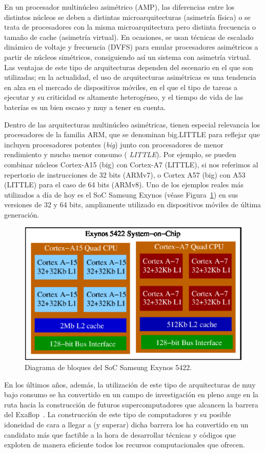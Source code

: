 En un procesador multinúcleo asimétrico (AMP), las diferencias entre los
distintos núcleos se deben a distintas microarquitecturas (asimetría
física) o se trata de procesadores con la misma microarquitectura pero
distinta frecuencia o tamaño de cache (asimetría virtual). En ocasiones, se
usan técnicas de escalado dinámico de voltaje y frecuencia (DVFS) para
emular procesadores asimétricos a partir de núcleos simétricos,
consiguiendo así un sistema con asimetría virtual. Las ventajas de este
tipo de arquitecturas dependen del escenario en el que son utilizadas; en
la actualidad, el uso de arquitecturas asimétricas es una tendencia en alza
en el mercado de dispositivos móviles, en el que el tipo de tareas a
ejecutar y su criticidad es altamente heterogéneo, y el tiempo de vida de
las baterías es un bien escaso y muy a tener en cuenta.

Dentro de las arquitecturas multinúcleo asimétricas, tienen especial
relevancia los procesadores de la familia ARM, que se denominan big.LITTLE
para reflejar que incluyen procesadores potentes ({\em big}) junto con
procesadores de menor rendimiento y mucho menor consumo ({\em
  LITTLE}). Por ejemplo, se pueden combinar núcleos Cortex-A15 (big)
con Cortex-A7 (LITTLE), si nos referimos al repertorio de instrucciones de
32 bits (ARMv7), o Cortex A57 (big) con A53 (LITTLE) para el caso de 64
bits (ARMv8). Uno de los ejemplos reales más utilizados a día de hoy es el
SoC Samsung Exynos (véase Figura~\ref{fig:exynos}) en sus versiones de 32 y
64 bits, ampliamente utilizado en dispositivos móviles de última
generación.

\begin{figure}[th!]
\begin{center}
\includegraphics[width=0.4\columnwidth]{Figures/Exynos.eps}
\end{center}
\caption{\label{fig:exynos} Diagrama de bloques del SoC Samsung Exynos 5422.}
\end{figure}

En los últimos años, además, la utilización de este tipo de arquitecturas de muy bajo consumo se ha
convertido en un campo de investigación en pleno auge en la ruta hacia la construcción de futuros
supercomputadores que alcancen la barrera del Exaflop~\cite{Road,MontBlanc}. La construcción
de este tipo de computadores y su posible idoneidad de cara a llegar a (y superar) dicha barrera
los ha convertido en un candidato más que factible a la hora de desarrollar técnicas y códigos
que exploten de manera eficiente todos los recursos computacionales que ofrecen.

